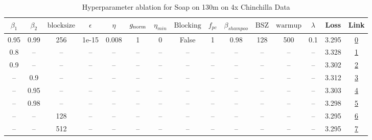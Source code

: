 \begin{table}[H]
\centering
\caption{Hyperparameter ablation for Soap on 130m on 4x Chinchilla Data}
\label{tab:ablation_soap_130m_on_4x_chinchilla_data}
\begin{tabular}{ccccccccccccccc}
\toprule
$\beta_1$ & $\beta_2$ & $\mathrm{block size}$ & $\epsilon$ & $\eta$ & $g_{\mathrm{norm}}$ & $\eta_{min}$ & $\mathrm{Blocking}$ & $f_{pc}$ & $\beta_{shampoo}$ & $\mathrm{BSZ}$ & $\mathrm{warmup}$ & $\lambda$ & Loss & Link \\
\midrule
0.95 & 0.99 & 256 & 1e-15 & 0.008 & 1 & 0 & False & 1 & 0.98 & 128 & 500 & 0.1 & 3.295 & \href{https://wandb.ai/marin-community/optimizer-scaling/runs/sweep-130m-10B-soapb00b89lr0.008-wd0.1-minlr0-warmup500-b10.95-b-6e13fd}{0} \\
\midrule
0.8 & -- & -- & -- & -- & -- & -- & -- & -- & -- & -- & -- & -- & 3.328 & \href{https://wandb.ai/marin-community/optimizer-scaling/runs/sweep-130m-10B-soap39d934lr0.008-wd0.1-minlr0-warmup500-b10.8-b2-b9ae87}{1} \\
0.9 & -- & -- & -- & -- & -- & -- & -- & -- & -- & -- & -- & -- & 3.302 & \href{https://wandb.ai/marin-community/optimizer-scaling/runs/sweep-130m-10B-soapf71ee4lr0.008-wd0.1-minlr0-warmup500-b10.9-b2-6ccd24}{2} \\
-- & 0.9 & -- & -- & -- & -- & -- & -- & -- & -- & -- & -- & -- & 3.312 & \href{https://wandb.ai/marin-community/optimizer-scaling/runs/sweep-130m-10B-soap2fe7delr0.008-wd0.1-minlr0-warmup500-b10.95-b-1ba13a}{3} \\
-- & 0.95 & -- & -- & -- & -- & -- & -- & -- & -- & -- & -- & -- & 3.303 & \href{https://wandb.ai/marin-community/optimizer-scaling/runs/sweep-130m-10B-soap7a5708lr0.008-wd0.1-minlr0-warmup500-b10.95-b-0ed803}{4} \\
-- & 0.98 & -- & -- & -- & -- & -- & -- & -- & -- & -- & -- & -- & 3.298 & \href{https://wandb.ai/marin-community/optimizer-scaling/runs/sweep-130m-10B-soap565dbblr0.008-wd0.1-minlr0-warmup500-b10.95-b-6a88a8}{5} \\
-- & -- & 128 & -- & -- & -- & -- & -- & -- & -- & -- & -- & -- & 3.295 & \href{https://wandb.ai/marin-community/optimizer-scaling/runs/sweep-130m-10B-soap25235clr0.008-wd0.1-minlr0-warmup500-b10.95-b-54f40d}{6} \\
-- & -- & 512 & -- & -- & -- & -- & -- & -- & -- & -- & -- & -- & 3.295 & \href{https://wandb.ai/marin-community/optimizer-scaling/runs/sweep-130m-10B-soap8ed7d6lr0.008-wd0.1-minlr0-warmup500-b10.95-b-764133}{7} \\

\end{tabular}
\end{table}
